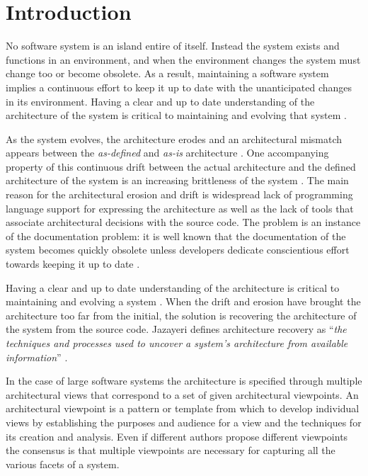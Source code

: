 \documentclass[preprint,12pt]{elsarticle}
\begin{document}
\section{Introduction}
\label{sec:Introduction}

No software system is an island entire of itself. Instead the system exists and functions in an environment, and when the environment changes the system must change too or become obsolete\cite{lehman-softev}. As a result, maintaining a software system implies a continuous effort to keep it up to date with the unanticipated changes in its environment. Having a clear and up to date understanding of the architecture of the system is critical to maintaining and evolving that system \cite{Duca09c}.


As the system evolves, the architecture erodes \cite{perry-foundations} and an architectural mismatch appears between the {\em as-defined} and {\em as-is} architecture \cite{garlan-mismatch}.
One accompanying property of this continuous drift between the actual architecture and the defined architecture of the system is an increasing brittleness of the system \cite{perry-foundations}. The main reason for the architectural erosion and drift is widespread lack of programming language support for expressing the architecture as well as the lack of tools that associate architectural decisions with the source code. The problem is an instance of the documentation problem: it is well known that the documentation of the system becomes quickly obsolete unless developers dedicate conscientious effort towards keeping it up to date \cite{riva-report}.

Having a clear and up to date understanding of the architecture is critical to maintaining and evolving a system \cite{pollet-sar}. When the drift and erosion have brought the architecture too far from the initial, the solution is recovering the architecture of the system from the source code. Jazayeri defines architecture recovery as ``{\em the techniques and processes used to uncover a system’s architecture from available information}'' \cite{jaza-archevo}. 


In the case of large software systems the architecture is specified through multiple architectural views that correspond to a set of given architectural viewpoints. An architectural viewpoint is a pattern or template from which to develop individual views by establishing the purposes and audience for a view and the techniques for its creation and analysis. Even if different authors propose different viewpoints \cite{bass-architecture, kruchten-4plus, hof-apparch} the consensus is that multiple viewpoints are necessary for capturing all the various facets of a system.
\end{document}
